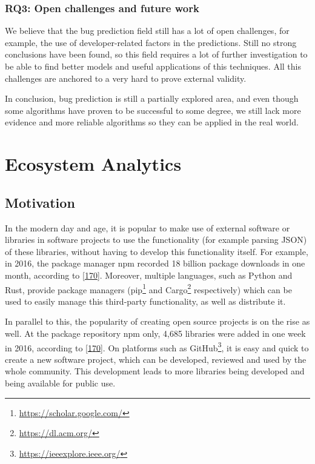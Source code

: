 \documentclass[]{book}
\let\rmarkdownfootnote\footnote%
\def\footnote{\protect\rmarkdownfootnote}
\begin{document}
\subsection{RQ3: Open challenges and future
work}\label{rq3-open-challenges-and-future-work}

We believe that the bug prediction field still has a lot of open
challenges, for example, the use of developer-related factors in the
predictions. Still no strong conclusions have been found, so this field
requires a lot of further investigation to be able to find better models
and useful applications of this techniques. All this challenges are
anchored to a very hard to prove external validity.

In conclusion, bug prediction is still a partially explored area, and
even though some algorithms have proven to be successful to some degree,
we still lack more evidence and more reliable algorithms so they can be
applied in the real world.

\chapter{Ecosystem Analytics}\label{ecosystem-analytics}

\section{Motivation}\label{motivation-3}

In the modern day and age, it is popular to make use of external
software or libraries in software projects to use the functionality (for
example parsing JSON) of these libraries, without having to develop this
functionality itself. For example, in 2016, the package manager npm
recorded 18 billion package downloads in one month, according to
{[}\protect\hyperlink{ref-Linux2016}{170}{]}. Moreover, multiple
languages, such as Python and Rust, provide package managers
(pip\footnote{\url{https://scholar.google.com/}} and Cargo\footnote{\url{https://dl.acm.org/}}
respectively) which can be used to easily manage this third-party
functionality, as well as distribute it.

In parallel to this, the popularity of creating open source projects is
on the rise as well. At the package repository npm only, 4,685 libraries
were added in one week in 2016, according to
{[}\protect\hyperlink{ref-Linux2016}{170}{]}. On platforms such as
GitHub\footnote{\url{https://ieeexplore.ieee.org/}}, it is easy and
quick to create a new software project, which can be developed, reviewed
and used by the whole community. This development leads to more
libraries being developed and being available for public use.
\end{document}
